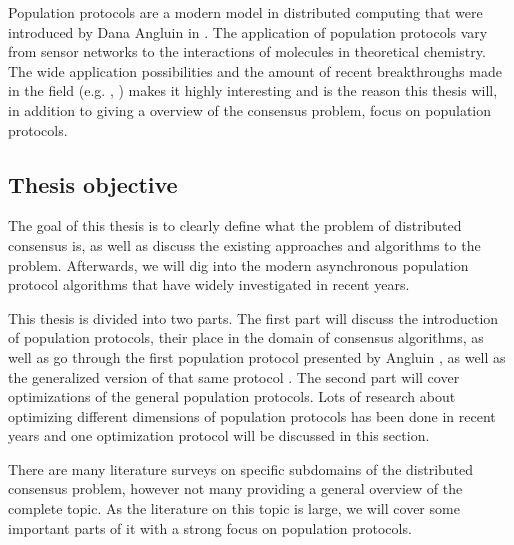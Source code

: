 Population protocols are a modern model in distributed computing that were introduced by Dana Angluin in \cite{angluinComputationNetworksPassively2006}. The application of population protocols vary from sensor networks to the interactions of molecules in theoretical chemistry. \cite{aspnesIntroductionPopulationProtocols2009} The wide application possibilities and the amount of recent breakthroughs made in the field (e.g. \cite{dotyTimeSpaceOptimal2022}, \cite{bankhamerPopulationProtocolsExact2022}) makes it highly interesting and is the reason this thesis will, in addition to giving a overview of the consensus problem, focus on population protocols.

\clearpage

\subsection{Thesis objective}
The goal of this thesis is to clearly define what the problem of distributed consensus is, as well as discuss the existing approaches and algorithms to the problem. Afterwards, we will dig into the modern asynchronous population protocol algorithms that have widely investigated in recent years. 

This thesis is divided into two parts. The first part will discuss the introduction of population protocols, their place in the domain of consensus algorithms, as well as go through the first population protocol presented by Angluin \cite{angluinSimplePopulationProtocol2008}, as well as the generalized version of that same protocol \cite{AspnesFastConverganceOfKOpinion2023}. The second part will cover optimizations of the general population protocols. Lots of research about optimizing different dimensions of population protocols has been done in recent years and one optimization protocol will be discussed in this section. 

There are many literature surveys on specific subdomains of the distributed consensus problem, however not many providing a general overview of the complete topic. As the literature on this topic is large, we will cover some important parts of it with a strong focus on population protocols.
